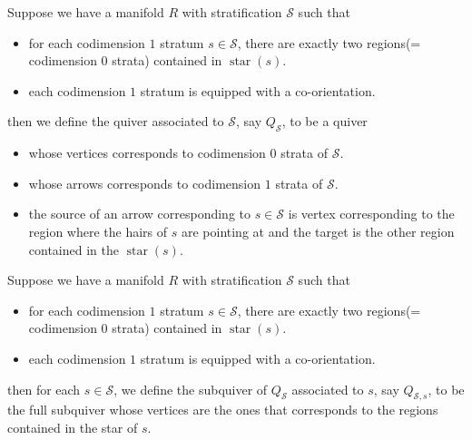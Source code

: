 \begin{definition}
Suppose we have a manifold $R$ with stratification $\mathcal{S}$ such that
\begin{itemize}
\item for each codimension $1$ stratum $s\in \mathcal{S}$, there are exactly two regions(= codimension $0$ strata) contained in $\operatorname{star}(s)$.

\item each codimension $1$ stratum is equipped with a co-orientation.
\end{itemize}
then we define the quiver associated to $\mathcal{S}$, say $Q_{\mathcal{S}}$, to be a quiver
\begin{itemize}
\item whose vertices corresponds to codimension $0$ strata of $\mathcal{S}$.

\item whose arrows corresponds to codimension $1$ strata of $\mathcal{S}$.

\item the source of an arrow corresponding to $s\in \mathcal{S}$ is  vertex corresponding to the region where the hairs of $s$ are pointing at and the target is the other region contained in the $\operatorname{star}(s)$.
\end{itemize}
\end{definition}

\begin{definition}
Suppose we have a manifold $R$ with stratification $\mathcal{S}$ such that
\begin{itemize}
\item for each codimension $1$ stratum $s\in \mathcal{S}$, there are exactly two regions(= codimension $0$ strata) contained in $\operatorname{star}(s)$.

\item each codimension $1$ stratum is equipped with a co-orientation.
\end{itemize}
then for each $s\in \mathcal{S}$, we define the subquiver of $Q_{\mathcal{S}}$ associated to $s$, say $Q_{\mathcal{S},s}$, to be the full subquiver whose vertices are the ones that corresponds to the regions contained in the star of $s$.
\end{definition}

